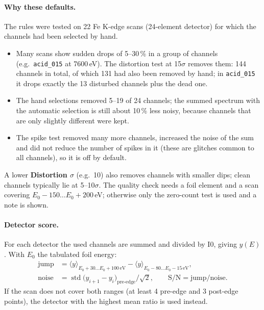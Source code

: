 \documentclass[11pt,a4paper]{article}
\newcommand{\ui}[1]{\textsf{\textbf{#1}}}          %
\newcommand{\file}[1]{\texttt{#1}}
\begin{document}
\paragraph{Why these defaults.} The rules were tested on 22 Fe K-edge scans (24-element detector)
for which the channels had been selected by hand.
\begin{itemize}
  \item Many scans show sudden drops of 5--30\,\% in a group of channels (e.g.\ \file{acid\_015}
        at 7600\,eV). The distortion test at 15$\sigma$ removes them: 144 channels in total, of which
        131 had also been removed by hand; in \file{acid\_015} it drops exactly the 13 disturbed channels
        plus the dead one.
  \item The hand selections removed 5--19 of 24 channels; the summed spectrum with the automatic
        selection is still about 10\,\% less noisy, because channels that are only slightly
        different were kept.
  \item The spike test removed many more channels, increased the noise of the sum and did not reduce
        the number of spikes in it (these are glitches common to all channels), so it is off by default.
\end{itemize}
A lower \ui{Distortion $\sigma$} (e.g.\ 10) also removes channels with smaller dips; clean channels
typically lie at 5--10$\sigma$. The quality check needs a foil element and a scan covering
$E_0-150\ldots E_0+200$\,eV; otherwise only the zero-count test is used and a note is shown.

\paragraph{Detector score.} For each detector the used channels are summed and
divided by I0, giving $y(E)$. With $E_0$ the tabulated foil energy:
\begin{align*}
  \text{jump}  &= \langle y\rangle_{E_0+30\ldots E_0+100\,\mathrm{eV}} - \langle y\rangle_{E_0-80\ldots E_0-15\,\mathrm{eV}},\\
  \text{noise} &= \operatorname{std}\bigl(y_{i+1}-y_i\bigr)_{\text{pre-edge}}\big/\sqrt{2},\qquad
  \text{S/N} = \text{jump}/\text{noise}.
\end{align*}
If the scan does not cover both ranges (at least 4 pre-edge and 3 post-edge points),
the detector with the highest mean ratio is used instead.
\end{document}
